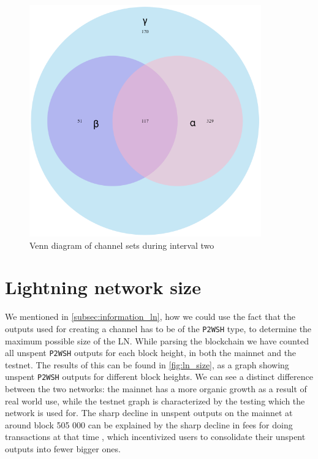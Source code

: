 \begin{figure}[ht]
    \centering
    \includegraphics[width=10cm]{figures/graphs/venn_run2.png}
    \caption{Venn diagram of channel sets during interval two}
    \label{fig:venn_run2}
\end{figure}

\section{Lightning network size}

We mentioned in \cref{subsec:information_ln}, how we could use the fact that the outputs used for creating a channel has to be of the {\tt P2WSH} type, to determine the maximum possible size of the LN.
While parsing the blockchain we have counted all unspent {\tt P2WSH} outputs for each block height, in both the mainnet and the testnet.
The results of this can be found in \cref{fig:ln_size}, as a graph showing unspent {\tt P2WSH} outputs for different block heights.
We can see a distinct difference between the two networks: the mainnet has a more organic growth as a result of real world use, while the testnet graph is characterized by the testing which the network is used for. The sharp decline in unspent outputs on the mainnet at around block 505 000 can be explained by the sharp decline in fees for doing transactions at that time \cite{mempool_stats}, which incentivized users to consolidate their unspent outputs into fewer bigger ones. 

